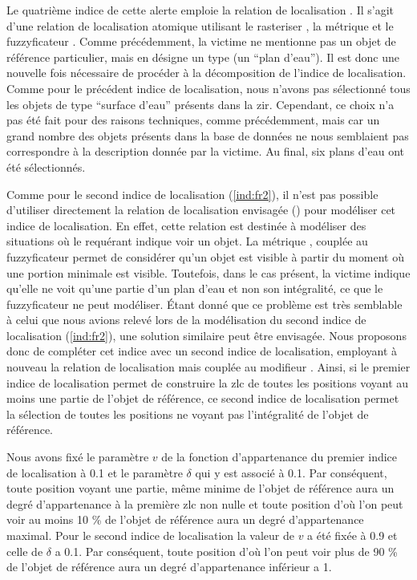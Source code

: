 Le quatrième indice de cette alerte emploie la relation de
localisation . Il s'agit d'une relation
de localisation atomique utilisant le rasteriser
, la métrique  et le
fuzzyficateur . Comme précédemment, la victime ne
mentionne pas un objet de référence particulier, mais en désigne un
type (\ie un \enquote{plan d'eau}). Il est donc une nouvelle fois
nécessaire de procéder à la décomposition de l'indice de
localisation. Comme pour le précédent indice de localisation, nous
n'avons pas sélectionné tous les objets de type \enquote{surface
  d'eau} présents dans la \ac{zir}. Cependant, ce choix n'a pas été
fait pour des raisons techniques, comme précédemment, mais car un
grand nombre des objets présents dans la base de données ne nous
semblaient pas correspondre à la description donnée par la victime. Au
final, six plans d'eau ont été sélectionnés.

Comme pour le second indice de localisation (\ref{ind:fr2}), il n'est
pas possible d'utiliser directement la relation de localisation
envisagée () pour modéliser cet indice de
localisation. En effet, cette relation est destinée à modéliser des
situations où le requérant indique voir un objet. La métrique
, couplée au fuzzyficateur
 permet de considérer qu'un objet est visible à
partir du moment où une portion minimale est visible. Toutefois, dans
le cas présent, la victime indique qu'elle ne voit qu'une partie d'un
plan d'eau et non son intégralité, ce que le fuzzyficateur
 ne peut modéliser. Étant donné que ce problème
est très semblable à celui que nous avions relevé lors de la
modélisation du second indice de localisation (\ref{ind:fr2}), une
solution similaire peut être envisagée. Nous proposons donc de
compléter cet indice avec un second indice de localisation, employant
à nouveau la relation de localisation 
mais couplée au modifieur . Ainsi, si le premier
indice de localisation permet de construire la \ac{zlc} de toutes les
positions voyant au moins une partie de l'objet de référence, ce
second indice de localisation permet la sélection de toutes les
positions ne voyant pas l'intégralité de l'objet de référence.

Nous avons fixé le paramètre \(v\) de la fonction d'appartenance du
premier indice de localisation à \num{0,1} et le paramètre \(\delta\)
qui y est associé à \num{0,1}. Par conséquent, toute position voyant
une partie, même minime de l'objet de référence aura un degré
d'appartenance à la première \ac{zlc} non nulle et toute position d'où
l'on peut voir au moins 10 \% de l'objet de référence aura un degré
d'appartenance maximal. Pour le second indice de localisation la
valeur de \(v\) a été fixée à \num{0,9} et celle de \(\delta\) a
\num{0,1}. Par conséquent, toute position d'où l'on peut voir plus de
90 \% de l'objet de référence aura un degré d'appartenance inférieur a
1.

